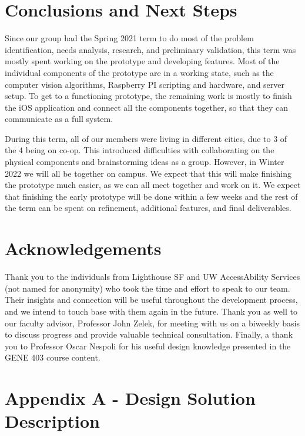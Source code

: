 \documentclass[a4paper,11pt]{article}
\begin{document}
\section{Conclusions and Next Steps}
Since our group had the Spring 2021 term to do most of the problem identification, needs analysis, research, and preliminary validation, this term was mostly spent working on the prototype and developing features. Most of the individual components of the prototype are in a working state, such as the computer vision algorithms, Raspberry PI scripting and hardware, and server setup. To get to a functioning prototype, the remaining work is mostly to finish the iOS application and connect all the components together, so that they can communicate as a full system.

During this term, all of our members were living in different cities, due to 3 of the 4 being on co-op. This introduced difficulties with collaborating on the physical components and brainstorming ideas as a group. However, in Winter 2022 we will all be together on campus. We expect that this will make finishing the prototype much easier, as we can all meet together and work on it. We expect that finishing the early prototype will be done within a few weeks and the rest of the term can be spent on refinement, additional features, and final deliverables.


\section{Acknowledgements}
Thank you to the individuals from Lighthouse SF and UW AccessAbility Services (not named for anonymity) who took the time and effort to speak to our team. Their insights and connection will be useful throughout the development process, and we intend to touch base with them again in the future. Thank you as well to our faculty advisor, Professor John Zelek, for meeting with us on a biweekly basis to discuss progress and provide valuable technical consultation. Finally, a thank you to Professor Oscar Nespoli for his useful design knowledge presented in the GENE 403 course content.

\newpage
\section{Appendix A - Design Solution Description}
\end{document}
